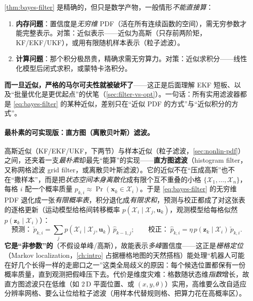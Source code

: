 \begin{pitfall}
\cref{thm:bayes-filter} 是精确的，但只是数学产物，一般情形\emph{不能直接算}\cite{barfoot2024state}：
\begin{enumerate}
  \item \textbf{内存问题}：置信度是\emph{无穷维} PDF（活在所有连续函数的空间），需无穷参数才能完整表示。对策：近似表示——近似为高斯（只存前两阶矩，KF/EKF/UKF），或用有限随机样本表示（粒子滤波）。
  \item \textbf{计算问题}：那个积分极昂贵，精确求需无穷算力。对策：近似求积分——线性化模型后闭式求积，或蒙特卡洛积分。
\end{enumerate}
\textbf{而一旦近似，严格的马尔可夫性就被破坏了}——这正是后面理解 EKF 短板、以及“批量优化是更优起点”的伏笔（\cref{sec:filter-vs-opt}）。一句话：所有实用滤波器都是 \cref{eq:bayes-filter} 的某种近似，差别只在“近似 PDF 的方式”与“近似积分的方式”。
\end{pitfall}

\paragraph{最朴素的可实现版：直方图（离散贝叶斯）滤波。}
高斯近似（KF/EKF/UKF，下两节）与样本近似（粒子滤波，\cref{sec:nonlin-pdf}）之间，还夹着一支\emph{最朴素}却最先“能算”的实现——\textbf{直方图滤波}（histogram filter，又称网格滤波 grid filter，或离散贝叶斯滤波）\cite{thrun2005probabilistic}。它的近似不在“压成高斯”也不在“撒样本”，而是把\emph{状态空间本身离散化}成有限个互不重叠的小格 $\{\mathcal{X}_1,\dots,\mathcal{X}_n\}$，每格 $i$ 配一个概率质量 $p_{k,i}\approx\Pr(\mathbf{x}_k\in\mathcal{X}_i)$。于是 \cref{eq:bayes-filter} 的无穷维 PDF 退化成一张\emph{有限概率表}，积分退化成\emph{有限求和}，预测与校正都成了对这张表的逐格更新（运动模型给格间转移概率 $p(\mathcal{X}_i\mid\mathcal{X}_j,\mathbf{u}_k)$，观测模型给每格似然 $p(\mathbf{z}_k\mid\mathcal{X}_i)$）：
\begin{equation}
  \text{预测：}\ \check{p}_{k,i}=\sum_{j}p(\mathcal{X}_i\mid\mathcal{X}_j,\mathbf{u}_k)\,\hat{p}_{k-1,j};\qquad
  \text{校正：}\ \hat{p}_{k,i}=\eta\,p(\mathbf{z}_k\mid\mathcal{X}_i)\,\check{p}_{k,i}.
  \label{eq:histogram-filter}
\end{equation}
\textbf{它是“非参数”的}（不假设单峰/高斯），故能表示\emph{多峰}置信度——这正是\emph{栅格定位}（Markov localization，\cref{ch:intro} 占据栅格地图的天然搭档）能处理“机器人可能在好几个长得一样的走廊口之一”这类全局歧义的原因：每个候选位置都保有一份概率质量，直到观测把假峰压下去。代价是维度灾难：格数随状态维\emph{指数}增长，故直方图滤波只在低维（如 $2$\,D 平面位置、或 $(x,y,\theta)$）实用，高维要么改自适应分辨率网格、要么让位给粒子滤波（用样本代替规则格、把算力花在高概率区）。

